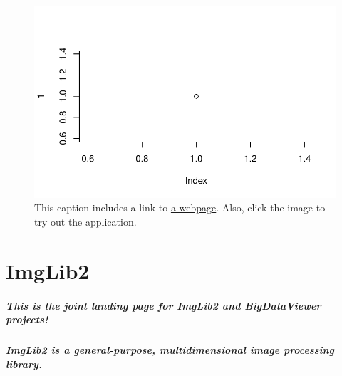 \documentclass[
  letterpaper,
  DIV=11,
  numbers=noendperiod]{scrartcl}
\let\oldsubparagraph\subparagraph
\renewcommand{\subparagraph}[1]{\oldsubparagraph{#1}\mbox{}}
\begin{document}
\begin{figure}[H]

{\centering \includegraphics{index_files/figure-pdf/fig-elephant2-1.pdf}

}

\caption{\label{fig-elephant2}This caption includes a link to
\href{https://en.wikipedia.org/wiki/Elephant}{a webpage}. Also, click
the image to try out the application.}

\end{figure}

\hypertarget{imglib2}{%
\section{ImgLib2}\label{imglib2}}

\hypertarget{this-is-the-joint-landing-page-for-imglib2-and-bigdataviewer-projects}{%
\subparagraph{This is the joint landing page for ImgLib2 and
BigDataViewer
projects!}\label{this-is-the-joint-landing-page-for-imglib2-and-bigdataviewer-projects}}

\hypertarget{imglib2-is-a-general-purpose-multidimensional-image-processing-library.}{%
\subparagraph{ImgLib2 is a general-purpose, multidimensional image
processing
library.}\label{imglib2-is-a-general-purpose-multidimensional-image-processing-library.}}
\end{document}
